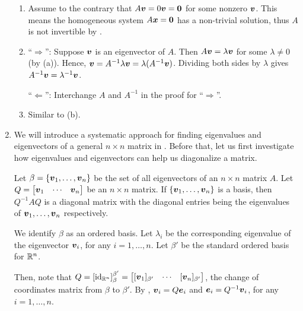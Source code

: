 \begin{enumerate}
\begin{pf}
\begin{enumerate}
\item Assume to the contrary that \(A\vb*{v}=0\vb*{v}=\vb*{0}\) for some
nonzero \(\vb*{v}\). This means the homogeneous system \(A\vb*{x}=\vb*{0}\)
has a non-trivial solution, thus \(A\) is not invertible by
.

\item ``\(\Rightarrow\)'': Suppose \(\vb*{v}\) is an eigenvector of \(A\).
Then \(A\vb*{v}=\lambda\vb*{v}\) for some \(\lambda\ne 0\) (by (a)). Hence,
\(\vb*{v}=A^{-1}\lambda\vb*{v}=\lambda(A^{-1}\vb*{v})\). Dividing both sides
by \(\lambda\) gives \(A^{-1}\vb*{v}=\lambda^{-1}\vb*{v}\).

``\(\Leftarrow\)'': Interchange \(A\) and \(A^{-1}\) in the proof for
``\(\Rightarrow\)''.

\item Similar to (b).
\end{enumerate}
\end{pf}
\item We will introduce a systematic approach for finding eigenvalues and
eigenvectors of a general \(n\times n\) matrix in .
Before that, let us first investigate how eigenvalues and eigenvectors can help
us diagonalize a matrix.

\begin{theorem}
\label{thm:eigen-diag}
Let \(\beta=\{\vb*{v}_1,\dotsc,\vb*{v}_n\}\) be the set of all eigenvectors
of an \(n\times n\) matrix \(A\). Let \(Q=\mqty[\vect{v}_1&\cdots&\vect{v}_n]\)
be an \(n\times n\) matrix. If \(\{\vb*{v}_1,\dotsc,\vb*{v}_n\}\) is a basis,
then \(Q^{-1}AQ\) is a diagonal matrix with the diagonal entries being the
eigenvalues of \(\vb*{v}_1,\dotsc,\vb*{v}_n\) respectively.
\end{theorem}
\begin{pf}
We identify \(\beta\) as an ordered basis. Let \(\lambda_i\) be the
corresponding eigenvalue of the eigenvector \(\vb*{v}_i\), for any
\(i=1,\dotsc,n\). Let \(\beta'\) be the standard ordered basis for \(\mathbb{R}^n\).

Then, note that
\(Q=[\id_{\R^n}]_{\beta}^{\beta'}=\mqty[[\vect{v}_1]_{\beta'}&\cdots&[\vect{v}_n]_{\beta'}]\),
the change of coordinates matrix from \(\beta\) to \(\beta'\). By
, \(\vb*{v}_i=Q\vb*{e}_i\) and
\(\vb*{e}_i=Q^{-1}\vb*{v}_i\), for any \(i=1,\dotsc,n\).


\end{pf}
\end{enumerate}
